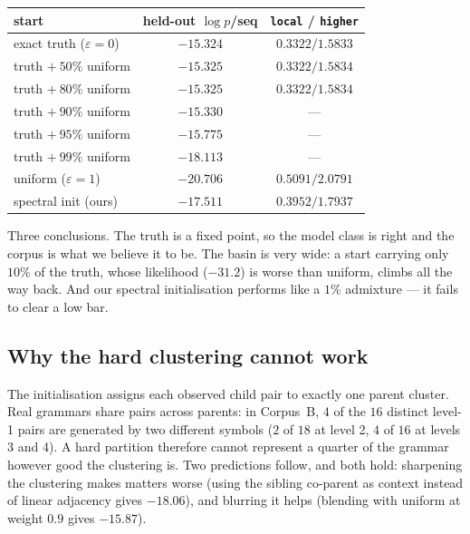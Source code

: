 \begin{center}
\begin{tabular}{lcc}
\toprule
start & held-out $\log p$/seq & \texttt{local} / \texttt{higher} \\
\midrule
exact truth ($\varepsilon=0$)          & $-15.324$ & $0.3322 / 1.5833$ \\
truth $+\ 50\%$ uniform                & $-15.325$ & $0.3322 / 1.5834$ \\
truth $+\ 80\%$ uniform                & $-15.325$ & $0.3322 / 1.5834$ \\
truth $+\ 90\%$ uniform                & $-15.330$ & --- \\
truth $+\ 95\%$ uniform                & $-15.775$ & --- \\
truth $+\ 99\%$ uniform                & $-18.113$ & --- \\
uniform ($\varepsilon=1$)              & $-20.706$ & $0.5091 / 2.0791$ \\
\midrule
spectral init (ours)                   & $-17.511$ & $0.3952 / 1.7937$ \\
\bottomrule
\end{tabular}
\end{center}

\noindent
Three conclusions. The truth is a fixed point, so the model class is right and
the corpus is what we believe it to be. The basin is very wide: a start
carrying only $10\%$ of the truth, whose likelihood ($-31.2$) is worse than
uniform, climbs all the way back. And our spectral initialisation performs like
a $1\%$ admixture --- it fails to clear a low bar.

\subsection{Why the hard clustering cannot work}

The initialisation assigns each observed child pair to exactly one parent
cluster. Real grammars share pairs across parents: in Corpus~B, $4$ of the $16$
distinct level-1 pairs are generated by two different symbols ($2$ of $18$ at
level 2, $4$ of $16$ at levels 3 and 4). A hard partition therefore cannot
represent a quarter of the grammar however good the clustering is. Two
predictions follow, and both hold: sharpening the clustering makes matters
worse (using the sibling co-parent as context instead of linear adjacency gives
$-18.06$), and blurring it helps (blending with uniform at weight $0.9$ gives
$-15.87$).

